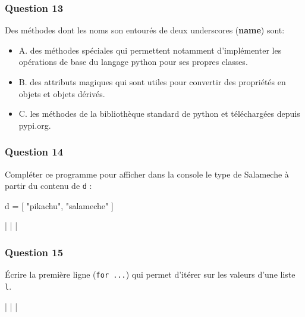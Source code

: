\documentclass[
]{article}
\newenvironment{Shaded}{}{}
\newcommand{\NormalTok}[1]{#1}
\newcommand{\OperatorTok}[1]{\textcolor[rgb]{0.40,0.40,0.40}{#1}}
\newcommand{\StringTok}[1]{\textcolor[rgb]{0.25,0.44,0.63}{#1}}
\providecommand{\tightlist}{%
  \setlength{\itemsep}{0pt}\setlength{\parskip}{0pt}}
\begin{document}
\hypertarget{question-13}{%
\subsubsection{Question 13}\label{question-13}}

Des méthodes dont les noms son entourés de deux underscores
(\textbf{name}) sont:

\begin{itemize}
\tightlist
\item
  A. des méthodes spéciales qui permettent notamment d'implémenter les
  opérations de base du langage python pour ses propres classes.
\item
  B. des attributs magiques qui sont utiles pour convertir des
  propriétés en objets et objets dérivés.
\item
  C. les méthodes de la bibliothèque standard de python et téléchargées
  depuis pypi.org.
\end{itemize}

\hypertarget{question-14}{%
\subsubsection{Question 14}\label{question-14}}

Compléter ce programme pour afficher dans la console le type de
Salameche à partir du contenu de \texttt{d} :

\begin{Shaded}
\begin{Highlighting}[]
\NormalTok{d }\OperatorTok{=}\NormalTok{ [ }\StringTok{"pikachu"}\NormalTok{, }\StringTok{"salameche"}\NormalTok{ ]}

\OperatorTok{|}
\OperatorTok{|}
\OperatorTok{|}
\end{Highlighting}
\end{Shaded}

\hypertarget{question-15}{%
\subsubsection{Question 15}\label{question-15}}

Écrire la première ligne (\texttt{for\ ...}) qui permet d'itérer sur les
valeurs d'une liste \texttt{l}.

\begin{Shaded}
\begin{Highlighting}[]
\OperatorTok{|}
\OperatorTok{|}
\OperatorTok{|}
\end{Highlighting}
\end{Shaded}
\end{document}
